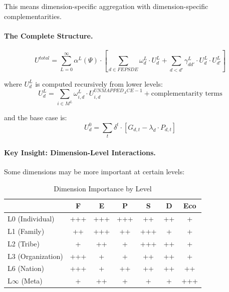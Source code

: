 This means dimension-specific aggregation with dimension-specific complementarities.

\paragraph{The Complete Structure.}

\begin{tcolorbox}[colback=green!5!white, colframe=green!75!black, title=AAA $\times$ C: Complete Utility Structure]
\begin{equation}
\boxed{
U^{total} = \sum_{L=0}^{\infty} \alpha^L(\Psi) \cdot \left[ \sum_{d \in FEPSDE} \omega^L_d \cdot U^L_d + \sum_{d < d'} \gamma^L_{dd'} \cdot U^L_d \cdot U^L_{d'} \right]
}
\end{equation}

where $U^L_d$ is computed recursively from lower levels:
\begin{equation}
U^L_d = \sum_{i \in M^L} \omega^L_{i,d} \cdot U^{UNMAPPED_ACE-1}_{i,d} + \text{complementarity terms}
\end{equation}

and the base case is:
\begin{equation}
U^0_d = \sum_t \delta^t \cdot [G_{d,t} - \lambda_d \cdot P_{d,t}]
\end{equation}
\end{tcolorbox}

\paragraph{Key Insight: Dimension-Level Interactions.}

Some dimensions may be more important at certain levels:

\begin{table}[htbp]
\centering
\caption{Dimension Importance by Level}
\label{tab:aaa-dimension-level}
\renewcommand{\arraystretch}{1.2}
\small
\begin{tabular}{@{}lcccccc@{}}
\toprule
& \textbf{F} & \textbf{E} & \textbf{P} & \textbf{S} & \textbf{D} & \textbf{Eco} \\
\midrule
L0 (Individual) & +++ & +++ & +++ & ++ & ++ & + \\
L1 (Family) & ++ & +++ & ++ & +++ & + & + \\
L2 (Tribe) & + & ++ & + & +++ & ++ & + \\
L3 (Organization) & +++ & + & + & ++ & ++ & + \\
L6 (Nation) & +++ & + & ++ & ++ & ++ & ++ \\
L$\infty$ (Meta) & + & ++ & + & + & + & +++ \\
\bottomrule
\end{tabular}
\end{table}

